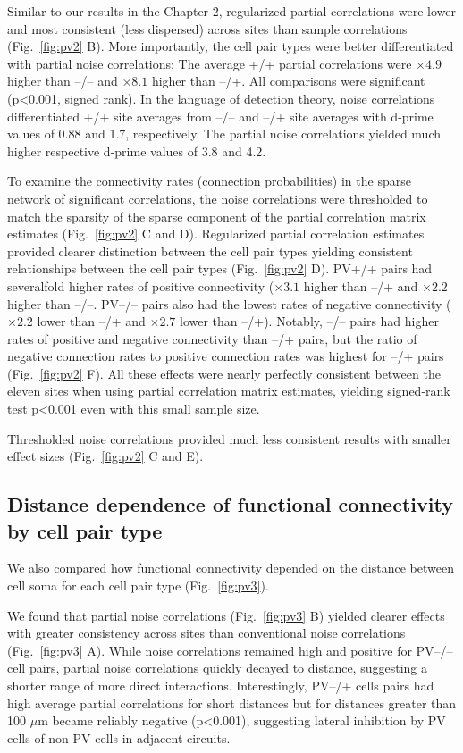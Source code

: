 Similar to our results in the Chapter 2, regularized partial correlations  were lower and most consistent (less dispersed) across sites than sample correlations (Fig.~\ref{fig:pv2} B).
More importantly, the cell pair types were better differentiated with partial noise correlations: 
The average +/+ partial correlations were $\times 4.9$ higher than --/-- and $\times 8.1$ higher than --/+.  
All comparisons were significant (p<0.001, signed rank).
In the language of detection theory, noise correlations differentiated  +/+ site averages from --/-- and --/+ site averages with d-prime values of 0.88 and 1.7, respectively. The partial noise correlations yielded much higher respective d-prime values of 3.8 and 4.2. 

To examine the connectivity rates (connection probabilities) in the sparse network of significant correlations, the noise correlations were thresholded to match the sparsity of the sparse component of the  partial correlation matrix estimates (Fig.~\ref{fig:pv2} C and D). 
Regularized partial correlation estimates provided clearer distinction between the cell pair types yielding consistent relationships between the cell pair types (Fig.~\ref{fig:pv2} D). PV+/+ pairs had severalfold higher rates of positive connectivity ($\times 3.1$ higher than --/+ and $\times 2.2$ higher than --/--. PV--/-- pairs also had the lowest rates of negative connectivity ($\times 2.2$ lower than --/+ and $\times 2.7$ lower than --/+). Notably, --/-- pairs had higher rates of positive and negative connectivity than --/+ pairs, but the ratio of negative connection rates to positive connection rates was highest for --/+ pairs (Fig.~\ref{fig:pv2} F).   All these effects were nearly perfectly consistent between the eleven sites when using partial correlation matrix estimates, yielding signed-rank test p<0.001 even with this small sample size.

Thresholded noise correlations provided much less consistent results with smaller effect sizes (Fig.~\ref{fig:pv2} C and E).

\subsection{Distance dependence of functional connectivity by cell pair type}
We also compared how functional connectivity depended on the distance between cell soma for each cell pair type (Fig.~\ref{fig:pv3}). 

We found that partial noise correlations (Fig.~\ref{fig:pv3} B)  yielded clearer effects with greater consistency across sites than conventional noise correlations (Fig.~\ref{fig:pv3} A). While noise correlations remained high and positive for PV--/-- cell pairs, partial noise correlations quickly decayed to distance, suggesting a shorter range of more direct interactions. Interestingly, PV--/+ cells pairs had high average partial correlations for short distances but for distances greater than 100 $\mu$m became reliably negative (p<0.001), suggesting lateral inhibition by PV cells of non-PV cells in adjacent circuits.

